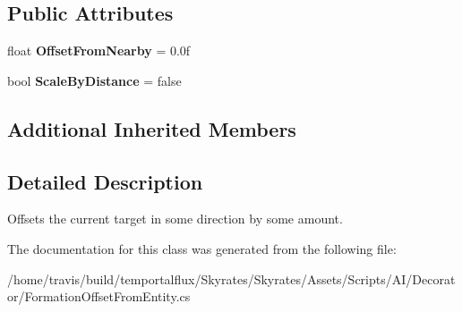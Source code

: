 \subsection*{Public Attributes}
\begin{DoxyCompactItemize}
\item 
\hypertarget{class_skyrates_1_1_a_i_1_1_decorator_1_1_formation_offset_from_entity_ae9619c9d4d65ce298baa70acf58e444d}{float {\bfseries Offset\-From\-Nearby} = 0.\-0f}\label{class_skyrates_1_1_a_i_1_1_decorator_1_1_formation_offset_from_entity_ae9619c9d4d65ce298baa70acf58e444d}

\item 
\hypertarget{class_skyrates_1_1_a_i_1_1_decorator_1_1_formation_offset_from_entity_a1e174598db2b2647e6a249273e854802}{bool {\bfseries Scale\-By\-Distance} = false}\label{class_skyrates_1_1_a_i_1_1_decorator_1_1_formation_offset_from_entity_a1e174598db2b2647e6a249273e854802}

\end{DoxyCompactItemize}
\subsection*{Additional Inherited Members}


\subsection{Detailed Description}
Offsets the current target in some direction by some amount. 



The documentation for this class was generated from the following file\-:\begin{DoxyCompactItemize}
\item 
/home/travis/build/temportalflux/\-Skyrates/\-Skyrates/\-Assets/\-Scripts/\-A\-I/\-Decorator/Formation\-Offset\-From\-Entity.\-cs\end{DoxyCompactItemize}
